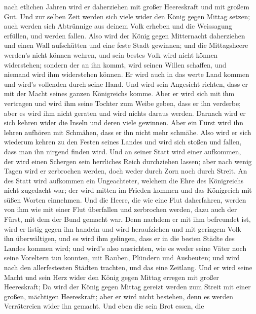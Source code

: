 nach etlichen Jahren wird er daherziehen mit großer Heereskraft und mit
großem Gut.  Und zur selben Zeit werden sich viele wider
den König gegen Mittag setzen; auch werden sich Abtrünnige aus deinem
Volk erheben und die Weissagung erfüllen, und werden fallen.
 Also wird der König gegen Mitternacht daherziehen und
einen Wall aufschütten und eine feste Stadt gewinnen; und die
Mittagsheere werden's nicht können wehren, und sein bestes Volk wird
nicht können widerstehen;  sondern der an ihn kommt, wird
seinen Willen schaffen, und niemand wird ihm widerstehen können. Er wird
auch in das werte Land kommen und wird's vollenden durch seine Hand.
 Und wird sein Angesicht richten, dass er mit der Macht
seines ganzen Königreichs komme. Aber er wird sich mit ihm vertragen und
wird ihm seine Tochter zum Weibe geben, dass er ihn verderbe; aber es
wird ihm nicht geraten und wird nichts daraus werden. 
Darnach wird er sich kehren wider die Inseln und deren viele gewinnen.
Aber ein Fürst wird ihn lehren aufhören mit Schmähen, dass er ihn nicht
mehr schmähe.  Also wird er sich wiederum kehren zu den
Festen seines Landes und wird sich stoßen und fallen, dass man ihn
nirgend finden wird.  Und an seiner Statt wird einer
aufkommen, der wird einen Schergen sein herrliches Reich durchziehen
lassen; aber nach wenig Tagen wird er zerbrochen werden, doch weder
durch Zorn noch durch Streit.  An des Statt wird
aufkommen ein Ungeachteter, welchem die Ehre des Königreichs nicht
zugedacht war; der wird mitten im Frieden kommen und das Königreich mit
süßen Worten einnehmen.  Und die Heere, die wie eine Flut
daherfahren, werden von ihm wie mit einer Flut überfallen und zerbrochen
werden, dazu auch der Fürst, mit dem der Bund gemacht war.
 Denn nachdem er mit ihm befreundet ist, wird er listig
gegen ihn handeln und wird heraufziehen und mit geringem Volk ihn
überwältigen,  und es wird ihm gelingen, dass er in die
besten Städte des Landes kommen wird; und wird's also ausrichten, wie es
weder seine Väter noch seine Voreltern tun konnten, mit Rauben, Plündern
und Ausbeuten; und wird nach den allerfestesten Städten trachten, und
das eine Zeitlang.  Und er wird seine Macht und sein Herz
wider den König gegen Mittag erregen mit großer Heereskraft; Da wird der
König gegen Mittag gereizt werden zum Streit mit einer großen, mächtigen
Heereskraft; aber er wird nicht bestehen, denn es werden Verrätereien
wider ihn gemacht.  Und eben die sein Brot essen, die
